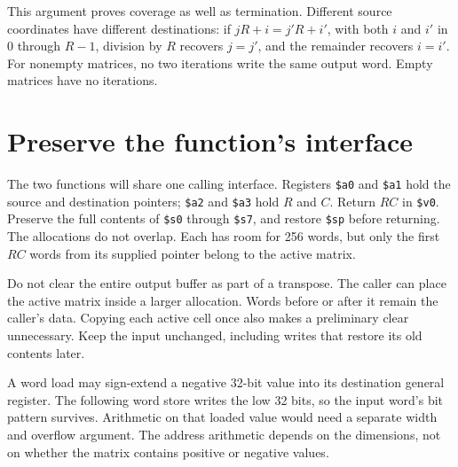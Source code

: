 This argument proves coverage as well as termination. Different source
coordinates have different destinations: if \(jR+i=j'R+i'\), with both
\(i\) and \(i'\) in \(0\) through \(R-1\), division by \(R\) recovers
\(j=j'\), and the remainder recovers \(i=i'\). For nonempty matrices, no two
iterations write the same output word. Empty matrices have no iterations.

\section{Preserve the function's interface}
The two functions will share one calling interface. Registers \texttt{\$a0} and
\texttt{\$a1} hold the source and destination pointers; \texttt{\$a2} and
\texttt{\$a3} hold \(R\) and \(C\). Return \(RC\) in \texttt{\$v0}.
Preserve the full contents of \texttt{\$s0} through \texttt{\$s7}, and restore
\texttt{\$sp} before returning. The allocations do not overlap. Each has room
for 256 words, but only the first \(RC\) words from its supplied pointer belong
to the active matrix.

Do not clear the entire output buffer as part of a transpose. The caller can
place the active matrix inside a larger allocation. Words before or after it
remain the caller's data. Copying each active cell once also makes a preliminary
clear unnecessary. Keep the input unchanged, including writes that restore its
old contents later.

A word load may sign-extend a negative 32-bit value into its destination general
register. The following word store writes the low 32 bits, so the input word's
bit pattern survives. Arithmetic on that loaded value would need a separate
width and overflow argument. The address arithmetic depends on the dimensions,
not on whether the matrix contains positive or negative values.
